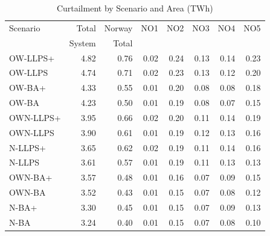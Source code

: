 \begin{table}[htbp]
\centering
\caption{Curtailment by Scenario and Area (TWh)}
\label{tab:curtailment_summary}
\begin{tabular}{lrrrrrrr}
\toprule
Scenario & Total & Norway & NO1 & NO2 & NO3 & NO4 & NO5 \\
         & System & Total &     &     &     &     &     \\
\midrule
OW-LLPS+ & 4.82 & 0.76 & 0.02 & 0.24 & 0.13 & 0.14 & 0.23 \\
OW-LLPS & 4.74 & 0.71 & 0.02 & 0.23 & 0.13 & 0.12 & 0.20 \\
OW-BA+ & 4.33 & 0.55 & 0.01 & 0.20 & 0.08 & 0.08 & 0.18 \\
OW-BA & 4.23 & 0.50 & 0.01 & 0.19 & 0.08 & 0.07 & 0.15 \\
OWN-LLPS+ & 3.95 & 0.66 & 0.02 & 0.20 & 0.11 & 0.14 & 0.19 \\
OWN-LLPS & 3.90 & 0.61 & 0.01 & 0.19 & 0.12 & 0.13 & 0.16 \\
N-LLPS+ & 3.65 & 0.62 & 0.02 & 0.19 & 0.11 & 0.14 & 0.16 \\
N-LLPS & 3.61 & 0.57 & 0.01 & 0.19 & 0.11 & 0.13 & 0.13 \\
OWN-BA+ & 3.57 & 0.48 & 0.01 & 0.16 & 0.07 & 0.09 & 0.15 \\
OWN-BA & 3.52 & 0.43 & 0.01 & 0.15 & 0.07 & 0.08 & 0.12 \\
N-BA+ & 3.30 & 0.45 & 0.01 & 0.15 & 0.07 & 0.09 & 0.13 \\
N-BA & 3.24 & 0.40 & 0.01 & 0.15 & 0.07 & 0.08 & 0.10 \\
\bottomrule
\end{tabular}
\end{table}